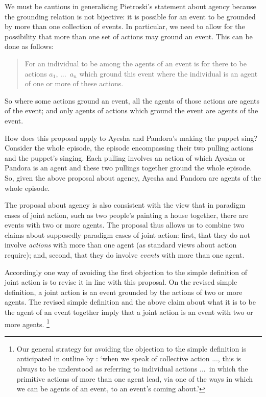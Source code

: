 \documentclass[12pt,a4paper]{extarticle}
\begin{document}
We must be cautious in generalising Pietroski's statement about agency because the grounding relation is not bijective:  it is possible for an event to be grounded by more than one collection of events.
In particular, we need to allow for the possibility that more than one set of actions may ground an event.
This can be done as follows:
%
\begin{quote}
	\label{agency_proposal}
For an individual to be among the agents of an event is for there to be actions $a_1$, ...\ $a_n$ which ground this event where the individual is an agent of one or more of these actions.
\end{quote}
%
So where some actions ground an event, all the agents of those actions are agents of the event; and only agents of actions which ground the event are agents of the event.

How does this proposal apply to Ayesha and Pandora's making the puppet sing?
Consider the whole episode, the episode encompassing their two pulling actions and the puppet's singing.
Each pulling involves an action of which Ayesha or Pandora is an agent
and these two pullings together ground the whole episode.
So, given the above proposal about agency, Ayesha and Pandora are agents of the whole episode. 

The proposal about agency is also consistent with the view that in paradigm cases of joint action, such as two people's painting a house together, there are events with two or more agents.
The proposal thus allows us to combine two claims about supposedly paradigm cases of joint action: first, that they do not involve \emph{actions} with more than one agent (as standard views about action require); and, second, that they do involve \emph{events} with more than one agent.

Accordingly one way of avoiding the first objection to the simple definition of joint action is to revise it in line with this proposal.  
On the revised simple definition, a joint action is an event grounded by the actions of two or more agents.
The revised simple definition and the above claim about what it is to be the agent of an event together imply that
%
	a joint action is an event with two or more agents.%
%
\footnote{
Our general strategy for avoiding the objection to the simple definition is anticipated in outline by \citet[p.\ 376]{ludwig_collective_2007}:
`when we speak of collective action ..., this is always to be understood as referring to individual actions ...\ in which the primitive actions of more than one agent lead, via one of the ways in which we can be agents of an event, to an event’s coming about.' 
}
%
\end{document}
